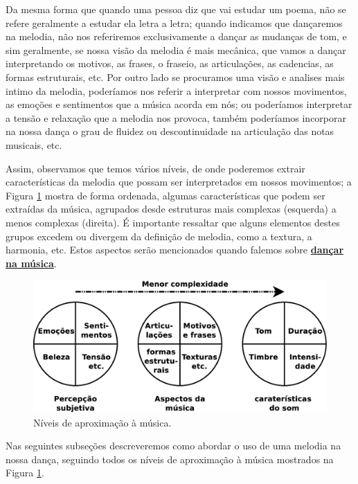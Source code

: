 Da mesma forma que quando uma pessoa diz que vai estudar um poema, 
não se refere geralmente a estudar ela letra a letra;
quando indicamos que dançaremos na melodia,
não nos referiremos exclusivamente a dançar as mudanças de tom, 
e sim geralmente, se nossa visão da melodia é mais mecânica, que vamos a dançar interpretando os motivos, as frases,
o fraseio, as articulações, as cadencias, as formas estruturais, etc.
Por outro lado se procuramos uma visão e analises mais intimo da melodia,
poderíamos nos referir a interpretar com nossos movimentos, as emoções e sentimentos que a música acorda em nós;
ou poderíamos interpretar a tensão e relaxação que a melodia nos provoca,
também poderíamos incorporar na nossa dança o grau de fluidez ou descontinuidade na articulação das notas musicais, etc.

Assim, observamos que temos vários níveis, 
de onde poderemos extrair características da melodia que possam ser interpretados em nossos movimentos;
a Figura \ref{fig:etapa-melodica-1} mostra de forma ordenada,
algumas características que podem ser extraídas da música, 
agrupados desde estruturas mais complexas (esquerda) a menos complexas (direita).
É importante ressaltar que alguns elementos destes grupos excedem ou divergem da definição de melodia, 
como a textura, a harmonia, etc.
Estos aspectos serão mencionados quando falemos sobre \hyperref[subsec:dancamusica]{\textbf{dançar na música}}.

\begin{figure}[!h]
    \centering
    \includegraphics[width=\textwidth]{chapters/cap-musicalidade-tecnica/etapa-melodica-1.eps}
    \caption{Níveis de aproximação à música.}
    \label{fig:etapa-melodica-1}
\end{figure}

Nas seguintes subseções descreveremos como abordar o uso de uma melodia na nossa dança,
seguindo todos os níveis de aproximação à música mostrados na Figura \ref{fig:etapa-melodica-1}.


